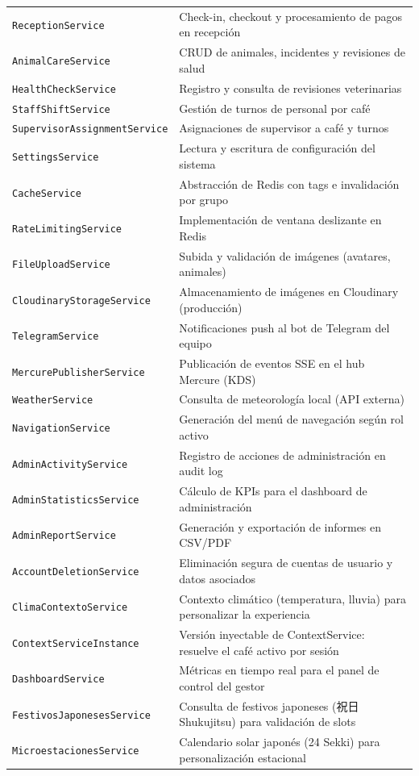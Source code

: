 \documentclass[12pt,a4paper,twoside,openright]{report}
\begin{document}
\begin{longtable}{@{}lp{8cm}@{}}
  \texttt{ReceptionService}            & Check-in, checkout y procesamiento de pagos en recepción\\
  \texttt{AnimalCareService}           & CRUD de animales, incidentes y revisiones de salud\\
  \texttt{HealthCheckService}          & Registro y consulta de revisiones veterinarias\\
  \texttt{StaffShiftService}           & Gestión de turnos de personal por café\\
  \texttt{SupervisorAssignmentService} & Asignaciones de supervisor a café y turnos\\
  \texttt{SettingsService}             & Lectura y escritura de configuración del sistema\\
  \texttt{CacheService}                & Abstracción de Redis con tags e invalidación por grupo\\
  \texttt{RateLimitingService}         & Implementación de ventana deslizante en Redis\\
  \texttt{FileUploadService}           & Subida y validación de imágenes (avatares, animales)\\
  \texttt{CloudinaryStorageService}    & Almacenamiento de imágenes en Cloudinary (producción)\\
  \texttt{TelegramService}             & Notificaciones push al bot de Telegram del equipo\\
  \texttt{MercurePublisherService}     & Publicación de eventos SSE en el hub Mercure (KDS)\\
  \texttt{WeatherService}              & Consulta de meteorología local (API externa)\\
  \texttt{NavigationService}           & Generación del menú de navegación según rol activo\\
  \texttt{AdminActivityService}        & Registro de acciones de administración en audit log\\
  \texttt{AdminStatisticsService}      & Cálculo de KPIs para el dashboard de administración\\
  \texttt{AdminReportService}          & Generación y exportación de informes en CSV/PDF\\
  \texttt{AccountDeletionService}      & Eliminación segura de cuentas de usuario y datos asociados\\
  \texttt{ClimaContextoService}        & Contexto climático (temperatura, lluvia) para personalizar la experiencia\\
  \texttt{ContextServiceInstance}      & Versión inyectable de ContextService: resuelve el café activo por sesión\\
  \texttt{DashboardService}            & Métricas en tiempo real para el panel de control del gestor\\
  \texttt{FestivosJaponesesService}    & Consulta de festivos japoneses (祝日 Shukujitsu) para validación de slots\\
  \texttt{MicroestacionesService}      & Calendario solar japonés (24 Sekki) para personalización estacional\\
\end{longtable}
\end{document}
